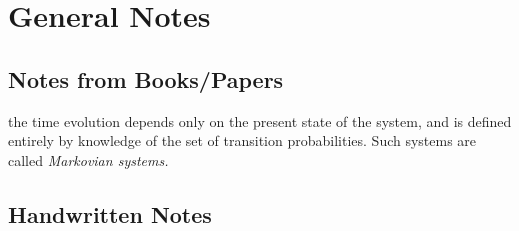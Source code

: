 \documentclass[../workflow.tex]{subfiles}
\begin{document}
    \section{General Notes}

    \etocignoretoctocdepth %
    \etocsettocstyle{\subsection*{\contentsname}}{}
    \localtableofcontents
    
    \subsection{Notes from Books/Papers}

    \begin{note} the time evolution depends only on the present state of the
        system, and is defined entirely by knowledge of the set of transition probabilities.
        Such systems are called \it{Markovian systems}.
    \end{note}


    \subsection{Handwritten Notes}
    
\end{document}
